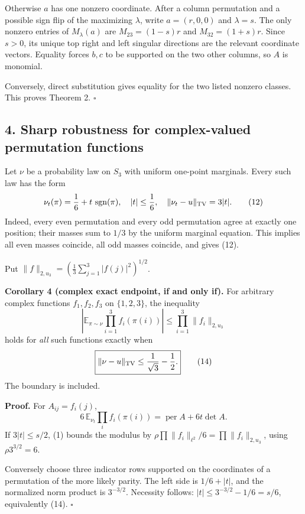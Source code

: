 \documentclass[
  11pt,
]{article}
\begin{document}
Otherwise \(a\) has one nonzero coordinate. After a column permutation
and a possible sign flip of the maximizing \(\lambda\), write
\(a=(r,0,0)\) and \(\lambda=s\). The only nonzero entries of
\(M_\lambda(a)\) are \(M_{23}=(1-s)r\) and \(M_{32}=(1+s)r\). Since
\(s>0\), its unique top right and left singular directions are the
relevant coordinate vectors. Equality forces \(b,c\) to be supported on
the two other columns, so \(A\) is monomial.

Conversely, direct substitution gives equality for the two listed
nonzero classes. This proves Theorem 2. \(\square\)

\subsection{4. Sharp robustness for complex-valued permutation
functions}\label{sharp-robustness-for-complex-valued-permutation-functions}

Let \(\nu\) be a probability law on \(S_3\) with uniform one-point
marginals. Every such law has the form \[
\nu_t(\pi)=\frac16+t\,\operatorname{sgn}(\pi),\quad
|t|\le\frac16,\quad \|\nu_t-u\|_{\rm TV}=3|t|.
\tag{12}
\] Indeed, every even permutation and every odd permutation agree at
exactly one position; their masses sum to \(1/3\) by the uniform
marginal equation. This implies all even masses coincide, all odd masses
coincide, and gives (12).

Put \(\|f\|_{2,u_3}=(\frac13\sum_{j=1}^3|f(j)|^2)^{1/2}\).

\textbf{Corollary 4 (complex exact endpoint, if and only if).} For
arbitrary complex functions \(f_1,f_2,f_3\) on \(\{1,2,3\}\), the
inequality \[
\left|\mathbb E_{\pi\sim\nu}\prod_{i=1}^3f_i(\pi(i))\right|
\le\prod_{i=1}^3\|f_i\|_{2,u_3}
\tag{13}
\] holds for \emph{all} such functions exactly when \[
\boxed{\|\nu-u\|_{\rm TV}\le
\frac1{\sqrt3}-\frac12.}
\tag{14}
\] The boundary is included.

\textbf{Proof.} For \(A_{ij}=f_i(j)\), \[
6\,\mathbb E_{\nu_t}\prod_if_i(\pi(i))
=\operatorname{per}A+6t\det A.
\] If \(3|t|\le s/2\), (1) bounds the modulus by
\(\rho\prod\|f_i\|_{\ell^2}/6=\prod\|f_i\|_{2,u_3}\), using
\(\rho 3^{3/2}=6\).

Conversely choose three indicator rows supported on the coordinates of a
permutation of the more likely parity. The left side is \(1/6+|t|\), and
the normalized norm product is \(3^{-3/2}\). Necessity follows:
\(|t|\le 3^{-3/2}-1/6=s/6\), equivalently (14). \(\square\)
\end{document}
